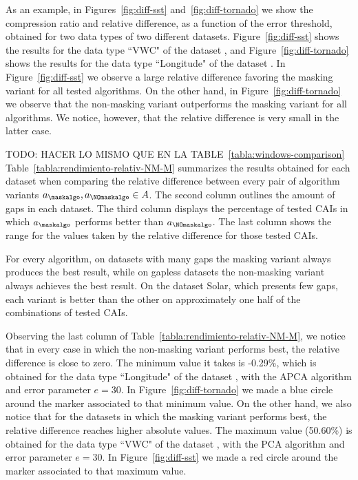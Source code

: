 \vspace{+2pt}
As an example, in Figures~\ref{fig:diff-sst} and~\ref{fig:diff-tornado} we show the compression ratio and relative difference, as a function of the error threshold, obtained for two data types of two different datasets. Figure~\ref{fig:diff-sst} shows the results for the data type ``VWC" of the dataset \datasetsst, and Figure~\ref{fig:diff-tornado} shows the results for the data type ``Longitude" of the dataset \datasettornado. In Figure~\ref{fig:diff-sst} we observe a large relative difference favoring the masking variant for all tested algorithms. On the other hand, in Figure~\ref{fig:diff-tornado} we observe that the non-masking variant outperforms the masking variant for all algorithms. We notice, however, that the relative difference is very small in the latter case.


\clearpage



\clearpage

TODO: HACER LO MISMO QUE EN LA TABLE~\ref{tabla:windows-comparison}\\
Table~\ref{tabla:rendimiento-relativ-NM-M} summarizes the results obtained for each dataset when comparing the relative difference between every pair of algorithm variants $a_\maskalgo, a_\NOmaskalgo \in A$. The second column outlines the amount of gaps in each dataset. The third column displays the percentage of tested CAIs in which $a_\maskalgo$ performs better than $a_\NOmaskalgo$. The last column shows the range for the values taken by the relative difference for those tested CAIs.


\vspace{+5pt}

\vspace{-5pt}


For every algorithm, on datasets with many gaps the masking variant always produces the best result, while on gapless datasets the non-masking variant always achieves the best result. On the dataset Solar, which presents few gaps, each variant is better than the other on approximately one half of the combinations of tested CAIs.


Observing the last column of Table~\ref{tabla:rendimiento-relativ-NM-M}, we notice that in every case in which the non-masking variant performs best, the relative difference is close to zero. The minimum value it takes is -0.29\%, which is obtained for the data type ``Longitude" of the dataset \datasettornado, with the APCA algorithm and error parameter $e=30$. In Figure~\ref{fig:diff-tornado} we made a blue circle around the marker associated to that minimum value. On the other hand, we also notice that for the datasets in which the masking variant performs best, the relative difference reaches higher absolute values. The maximum value (50.60\%) is obtained for the data type ``VWC" of the dataset \datasetsst, with the PCA algorithm and error parameter $e=30$. In Figure~\ref{fig:diff-sst} we made a red circle around the marker associated to that maximum value.


